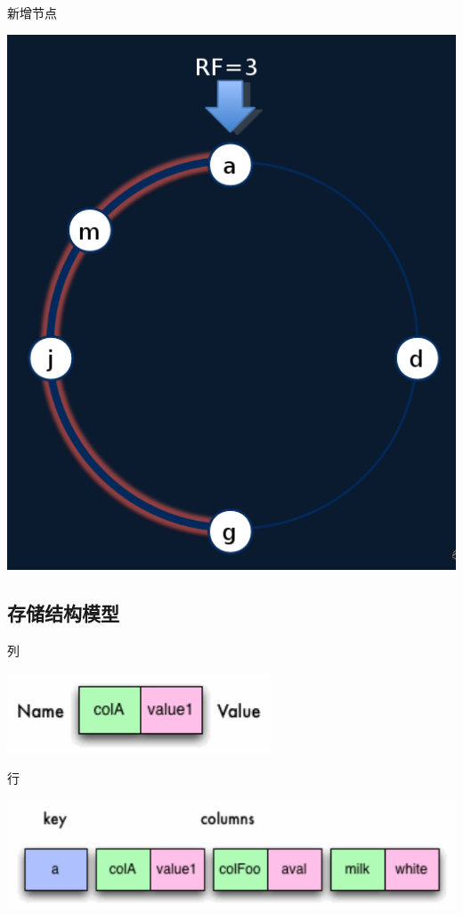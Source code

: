 \documentclass{beamer}
\begin{document}
\begin{CJK}{UTF8}{gbsn}
\begin{frame}{新增节点}
  \begin{center}
    \includegraphics[scale=0.22]{./images/new-node}
  \end{center}
\end{frame}

\subsection{存储结构模型}
\begin{frame}{列}
  \begin{center}
    \includegraphics[scale=0.4]{./images/column}
  \end{center}
\end{frame}

\begin{frame}{行}
  \begin{center}
    \includegraphics[scale=0.4]{./images/row}
  \end{center}
\end{frame}


\end{CJK}
\end{document}
